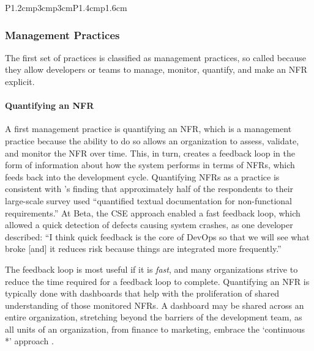 \documentclass[smallextended]{svjour3}
\begin{document}
\begin{longtable}{P{1.2cm}p{3cm}p{3cm}P{1.4cm}p{1.6cm}}



\end{longtable}
\endgroup 



\subsubsection{Management Practices}
\label{sub:management}
The first set of practices is classified as management practices, so called because they allow developers or teams to manage, monitor, quantify, and make an NFR explicit. 

\paragraph{Quantifying an NFR} A first management practice is quantifying an NFR, which is a management practice because the ability to do so allows an organization to assess, validate, and monitor the NFR over time. This, in turn, creates a feedback loop in the form of information about how the system performs in terms of NFRs, which feeds back into the development cycle. Quantifying NFRs as a practice is consistent with \citet{wagner2019status}'s finding that approximately half of the respondents to their large-scale survey used ``quantified textual documentation for non-functional requirements.''
At Beta, the CSE approach enabled a fast feedback loop, which allowed a quick detection of defects causing system crashes, as one developer described: 
\textmd{``I think quick feedback is the core of DevOps so that we will see what broke [and] it reduces risk because things are integrated more frequently.''}


The feedback loop is most useful if it is \emph{fast},  and many organizations strive to reduce the time required for a feedback loop to complete. 
Quantifying an NFR is typically done with dashboards that help with the proliferation of shared understanding of those monitored NFRs.
A dashboard may be shared across an entire organization, stretching beyond the barriers of the development team, as all units of an organization, from finance to marketing, embrace the `continuous *' approach \citep{fitzgerald2017continuous}.
\end{document}
